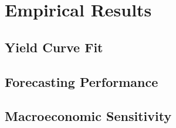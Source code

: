 \chapter{Empirical Results}

\section{Yield Curve Fit}

\section{Forecasting Performance}

\section{Macroeconomic Sensitivity}
